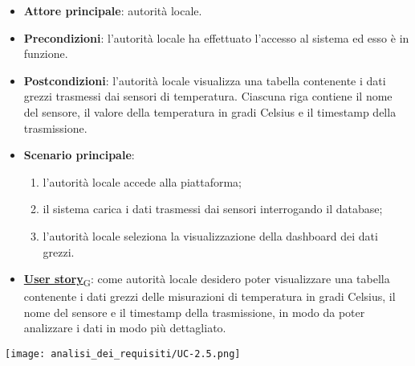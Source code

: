 \begin{itemize}
	\item \textbf{Attore principale}: autorità locale.
	\item \textbf{Precondizioni}: l'autorità locale ha effettuato l'accesso al sistema ed esso è in funzione.
	\item \textbf{Postcondizioni}: l'autorità locale visualizza una tabella contenente i dati grezzi trasmessi dai sensori di temperatura.
	      Ciascuna riga contiene il nome del sensore, il valore della temperatura in gradi Celsius e il timestamp della trasmissione.
	\item \textbf{Scenario principale}:
	      \begin{enumerate}
		      \item l'autorità locale accede alla piattaforma;
		      \item il sistema carica i dati trasmessi dai sensori interrogando il database;
		      \item l'autorità locale seleziona la visualizzazione della dashboard dei dati grezzi.
	      \end{enumerate}
	\item \href{https://7last.github.io/docs/pb/documentazione-interna/glossario\#user-story}{\textbf{User story}\textsubscript{G}}:
	      come autorità locale desidero poter visualizzare una tabella contenente i dati grezzi delle misurazioni di temperatura
	      in gradi Celsius, il nome del sensore e il timestamp della trasmissione, in modo da poter analizzare i dati in modo più dettagliato.
\end{itemize}
\begin{center}
	\texttt{[image: analisi\_dei\_requisiti/UC-2.5.png]}
\end{center}

